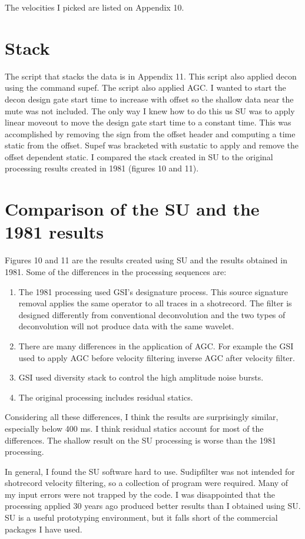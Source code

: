 The velocities I picked are listed on Appendix 10.


\section{Stack}
The script that stacks the data is in Appendix 11.  This script also
applied decon using the command supef.  The script also applied AGC.
I wanted to start the decon design gate start time to increase with
offset so the shallow data near the mute was not included.  The only
way I knew how to do this us SU was to apply linear moveout to move
the design gate start time to a constant time.  This was accomplished
by removing the sign from the offset header and computing a time
static from the offset.  Supef was bracketed with sustatic to apply
and remove the offset dependent static.  I compared the stack created
in SU to the original processing results created in 1981 (figures 10
and 11).
\section{Comparison of the SU and the 1981 results}
Figures 10 and 11 are the results created using SU and the results
obtained in 1981.  Some of the differences in the processing sequences
are:
\begin{enumerate}
\item The 1981 processing used GSI's designature process.  This source signature removal applies the same operator to all traces in a shotrecord.  The filter is designed differently from conventional deconvolution and the two types of deconvolution will not produce data with the same wavelet. 
\item There are many differences in the application of AGC.  For example the GSI used to apply AGC before velocity filtering 
inverse AGC after velocity filter.
\item GSI used diversity stack to control the high amplitude noise bursts.
\item The original processing includes residual statics.
\end{enumerate}
Considering all these differences, I think the results are
surprisingly similar, especially below 400 ms.  I think residual
statics account for most of the differences.  The shallow result on
the SU processing is worse than the 1981 processing.

In general, I found the SU software hard to use.  Sudipfilter was not
intended for shotrecord velocity filtering, so a collection of program
were required.  Many of my input errors were not trapped by the code.
I was disappointed that the processing applied 30 years ago produced
better results than I obtained using SU.  SU is a useful prototyping
environment, but it falls short of the commercial packages I have
used.

